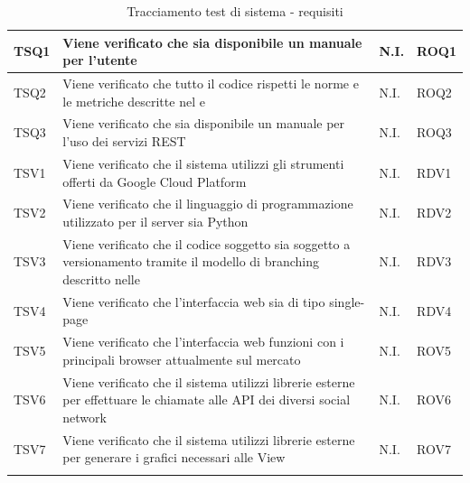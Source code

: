 \begin{center}
\begin{longtable}{| p{2cm} | p{7cm} | p{1.5cm} | p{2cm} |}
					\hline
					TSQ1 & Viene verificato che sia disponibile un manuale per l'utente & N.I. & ROQ1\\
					\hline
					TSQ2 & Viene verificato che tutto il codice rispetti le norme e le metriche descritte nel \docNameVersionPdQ{} e \docNameVersionNdP & N.I. & ROQ2\\
					\hline
					TSQ3 & Viene verificato che sia disponibile un manuale per l'uso dei servizi REST & N.I. & ROQ3\\
					\hline
					TSV1 & Viene verificato che il sistema utilizzi gli strumenti offerti da Google Cloud Platform & N.I. & RDV1\\
					\hline
					TSV2 & Viene verificato che il linguaggio di programmazione utilizzato per il server sia Python & N.I. & RDV2\\
					\hline
					TSV3 & Viene verificato che il codice soggetto sia soggetto a versionamento tramite il modello di branching descritto nelle \docNameVersionNdP & N.I. & RDV3\\
					\hline
					TSV4 & Viene verificato che l'interfaccia web sia di tipo single-page & N.I. & RDV4\\
					\hline
					TSV5 & Viene verificato che l'interfaccia web funzioni con i principali browser attualmente sul mercato& N.I. & ROV5\\
					\hline
					TSV6 & Viene verificato che il sistema utilizzi librerie esterne per effettuare le chiamate alle API dei diversi social network & N.I. & ROV6\\
					\hline
					TSV7 & Viene verificato che il sistema utilizzi librerie esterne per generare i grafici necessari alle View & N.I. & ROV7\\
					\hline
			\caption{Tracciamento test di sistema - requisiti}
			\end{longtable}
				\egroup
\end{center}
		
